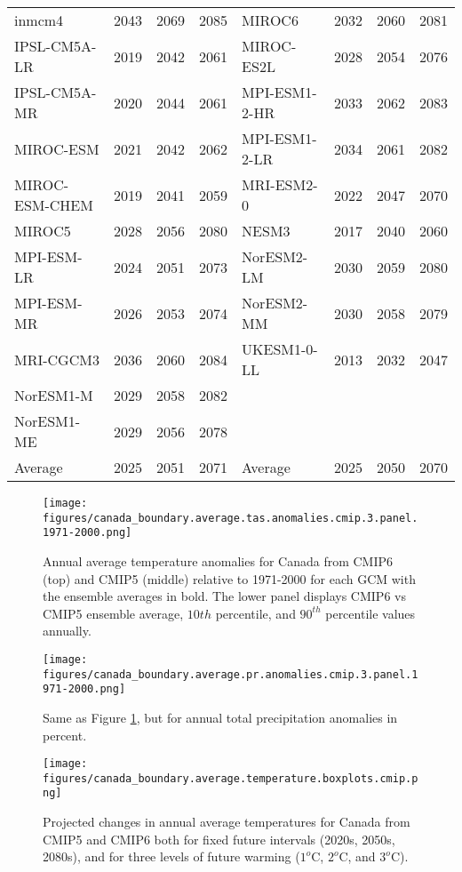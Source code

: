 \documentclass[]{scrartcl}
\begin{document}
\begin{table}[ht!]
\begin{center}
\begin{tabular}{|l|c|c|c|l|c|c|c|}
			inmcm4 & 2043 & 2069 & 2085 & MIROC6 & 2032 & 2060 & 2081 \\ 
			IPSL-CM5A-LR & 2019 & 2042 & 2061 & MIROC-ES2L & 2028 & 2054 & 2076 \\ 
			IPSL-CM5A-MR & 2020 & 2044 & 2061 & MPI-ESM1-2-HR & 2033 & 2062 & 2083 \\ 
			MIROC-ESM & 2021 & 2042 & 2062 & MPI-ESM1-2-LR & 2034 & 2061 & 2082 \\ 
			MIROC-ESM-CHEM & 2019 & 2041 & 2059 & MRI-ESM2-0 & 2022 & 2047 & 2070 \\ 
			MIROC5 & 2028 & 2056 & 2080 & NESM3 & 2017 & 2040 & 2060 \\ 
			MPI-ESM-LR & 2024 & 2051 & 2073 & NorESM2-LM & 2030 & 2059 & 2080 \\ 
			MPI-ESM-MR & 2026 & 2053 & 2074 & NorESM2-MM & 2030 & 2058 & 2079 \\ 
			MRI-CGCM3 & 2036 & 2060 & 2084 & UKESM1-0-LL & 2013 & 2032 & 2047 \\ 
			NorESM1-M & 2029 & 2058 & 2082 &  &  &  &  \\ 
			NorESM1-ME & 2029 & 2056 & 2078 &  &  &  &  \\ 
			Average & 2025 & 2051 & 2071 & Average & 2025 & 2050 & 2070 \\
			\hline
		\end{tabular}
	\end{center}
\end{table}	

\begin{figure}[ht!]
	\centering
	\texttt{[image: figures/canada\_boundary.average.tas.anomalies.cmip.3.panel.1971-2000.png]}
	\caption[TAS]{Annual average temperature anomalies for Canada from CMIP6 (top) and CMIP5 (middle) relative to 1971-2000 for each GCM with the ensemble averages in bold. The lower panel displays CMIP6 vs CMIP5 ensemble average, $10{th}$ percentile, and $90^{th}$ percentile values annually.}
	\label{fig:time_series_tas}
\end{figure}

\begin{figure}[ht!]
	\centering
	\texttt{[image: figures/canada\_boundary.average.pr.anomalies.cmip.3.panel.1971-2000.png]}
	\caption[Pr]{Same as Figure \ref{fig:time_series_tas}, but for annual total precipitation anomalies in percent.}
	\label{fig:time_series_pr}
\end{figure}

\begin{figure}[ht!]
	\centering
	\texttt{[image: figures/canada\_boundary.average.temperature.boxplots.cmip.png]}
	\caption[Tas]{Projected changes in annual average temperatures for Canada from CMIP5 and CMIP6 both for fixed future intervals (2020s, 2050s, 2080s), and for three levels of future warming ($1^o$C, $2^o$C, and $3^o$C). }
	\label{fig:tas_boxplots}
\end{figure}
\end{document}
